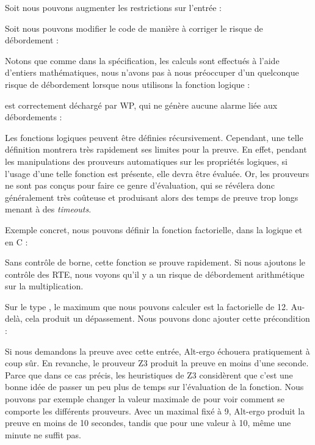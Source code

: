 Soit nous pouvons augmenter les restrictions sur l'entrée :




Soit nous pouvons modifier le code de manière à corriger le risque
de débordement :




Notons que comme dans la spécification, les calculs sont effectués à l'aide 
d'entiers mathématiques, nous n'avons pas à nous préoccuper d'un quelconque
risque de débordement lorsque nous utilisons la fonction logique :




est correctement déchargé par WP, qui ne génère aucune alarme liée aux
débordements :






Les fonctions logiques peuvent être définies récursivement. Cependant, une telle
définition montrera très rapidement ses limites pour la preuve. En effet, 
pendant les manipulations des prouveurs automatiques sur les propriétés 
logiques, si l'usage d'une telle fonction est présente, elle devra être évaluée.
Or, les prouveurs ne sont pas conçus pour faire ce genre d'évaluation, qui se 
révélera donc généralement très coûteuse et produisant alors des temps de preuve
trop longs menant à des \textit{timeouts}.



Exemple concret, nous pouvons définir la fonction factorielle, dans la logique
et en C :






Sans contrôle de borne, cette fonction se prouve rapidement. Si nous ajoutons
le contrôle des RTE, nous voyons qu'il y a un risque de débordement
arithmétique sur la multiplication.



Sur le type , le maximum que nous pouvons calculer est la factorielle de 
12. Au-delà, cela produit un dépassement. Nous pouvons donc ajouter cette 
précondition :






Si nous demandons la preuve avec cette entrée, Alt-ergo échouera pratiquement à 
coup sûr. En revanche, le prouveur Z3 produit la preuve en moins d'une seconde.
Parce que dans ce cas précis, les heuristiques de Z3 considèrent que c'est une
bonne idée de passer un peu plus de temps sur l'évaluation de la fonction. Nous
pouvons par exemple changer la valeur maximale de  pour voir comment se 
comporte les différents prouveurs. Avec un  maximal fixé à 9, Alt-ergo produit
la preuve en moins de 10 secondes, tandis que pour une valeur à 10, même une 
minute ne suffit pas.




